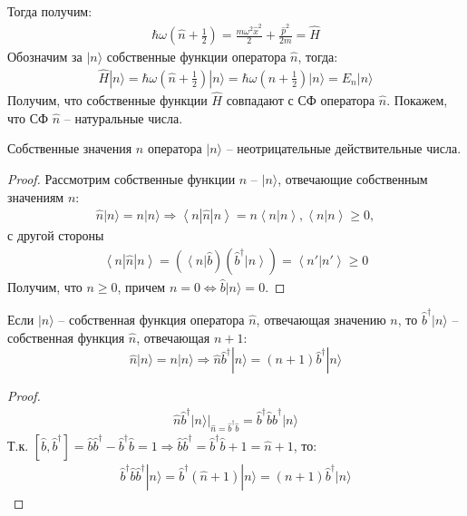 Тогда получим:
\begin{gather*}
\hbar\omega\left(\hat{n}+\frac{1}{2}\right)
=
\frac{m\omega^2\hat{x}^2}{2}+\frac{\hat{p}^2}{2m}
=
\hat{H}
\end{gather*}
Обозначим за $|n\rangle$ собственные функции оператора $\hat{n}$, тогда:
\begin{gather*}
\hat{H}|n\rangle
=
\hbar\omega\left(\hat{n}+\frac{1}{2}\right)|n\rangle
=
\hbar\omega\left(n+\frac{1}{2}\right)|n\rangle
=
E_n|n\rangle
\end{gather*}
Получим, что собственные функции $\hat{H}$ совпадают с СФ оператора $\hat{n}$. Покажем, что СФ $\hat{n}$ -- натуральные числа.

\begin{theorem}
Собственные значения $n$ оператора $|n\rangle$ -- неотрицательные действительные числа.
\end{theorem}
\begin{proof}
Рассмотрим собственные функции $\hat{n}$ -- $|n\rangle$, отвечающие собственным значениям $n$:
\begin{gather*}
\hat{n}|n\rangle = n|n\rangle
\Longrightarrow
\left< n| \hat{n}|n\right> = n \left<n|n\right>, \left<n|n\right> \ge 0,
\end{gather*}
с другой стороны
\begin{gather*}
\left< n| \hat{n}|n\right> = (\left< n\right|\hat{b})(\hat{b}^\dagger\left|n\right>) =
\left< n'|n'\right> \ge 0
\end{gather*}
Получим, что $n\ge 0$, причем $n=0\Leftrightarrow \hat{b}|n\rangle = 0$.
\end{proof}
\begin{theorem}
Если $|n\rangle$ -- собственная функция оператора $\hat{n}$, отвечающая значению $n$, то $\hat{b}^\dagger|n\rangle$ -- собственная функция $\hat{n}$, отвечающая $n+1$:
$$
\hat{n}|n\rangle=n|n\rangle\Longrightarrow\hat{n}\hat{b}^\dagger|n\rangle=(n+1)\hat{b}^\dagger|n\rangle
$$
\end{theorem}
\begin{proof}
\begin{gather*}
\hat{n}\hat{b}^\dagger|n\rangle
|_{\hat{n}=\hat{b}^\dagger\hat{b}}
=
\hat{b}^\dagger\hat{b}\hat{b}^\dagger|n\rangle
\end{gather*}
Т.к. $[\hat{b},\hat{b}^\dagger]=\hat{b}\hat{b}^\dagger-\hat{b}^\dagger\hat{b}=1\Longrightarrow\hat{b}\hat{b}^\dagger=\hat{b}^\dagger\hat{b}+1=\hat{n}+1$, то:
\begin{gather*}
\hat{b}^\dagger\hat{b}\hat{b}^\dagger|n\rangle
=
\hat{b}^\dagger(\hat{n}+1)|n\rangle
=
(n+1)\hat{b}^\dagger|n\rangle
\end{gather*}
\end{proof}
